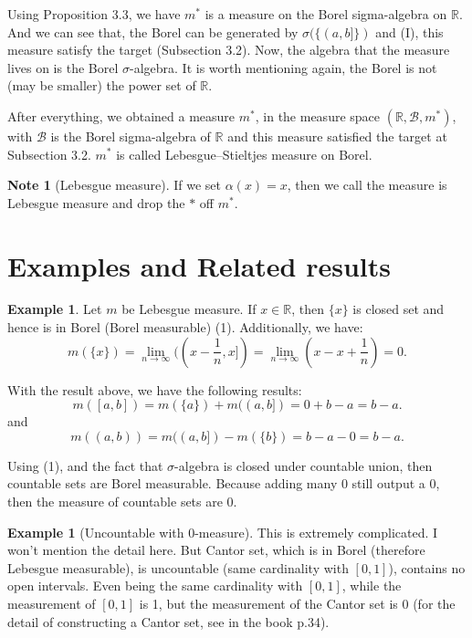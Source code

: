 \documentclass[11pt,a4paper]{article}
\theoremstyle{definition}
\newtheorem{example}[definition]{Example}
\newtheorem{note}[definition]{Note}
\theoremstyle{plain}
\newcommand{\R}{\mathbb{R}}
\begin{document}
Using Proposition 3.3, we have $m^*$ is a measure on the Borel sigma-algebra on $\R$. And we can see that, the Borel can be generated by $\sigma(\{(a,b]\})$ and (I), this measure satisfy the target (Subsection 3.2). Now, the algebra that the measure lives on is the Borel $\sigma$-algebra. It is worth mentioning again, the Borel is not (may be smaller) the power set of $\R$.

After everything, we obtained a measure $m^*$, in the measure space $(\R, \mathcal{B}, m^*)$, with $\mathcal{B}$ is the Borel sigma-algebra of $\R$ and this measure satisfied the target at Subsection 3.2. $m^*$ is called Lebesgue–Stieltjes measure on Borel.

\begin{note}[Lebesgue measure]
If we set $\alpha(x) = x$, then we call the measure is Lebesgue measure and drop the $*$ off $m^*$.
\end{note}

\section{Examples and Related results}

\begin{example}
Let $m$ be Lebesgue measure. If $x \in \R$, then $\{x\}$ is closed set and hence is in Borel (Borel measurable) (1). Additionally, we have:
\[
m(\{x\}) = \lim_{n\rightarrow \infty}((x-\frac{1}{n}, x]) = \lim_{n\rightarrow \infty}(x - x + \frac{1}{n}) = 0.
\]

With the result above, we have the following results:
\[
m([a,b]) = m(\{a\}) + m((a,b]) = 0 + b-a = b-a.
\]
and
\[
m((a,b)) = m((a,b])-m(\{b\}) = b-a-0 =b-a.
\]

Using (1), and the fact that $\sigma$-algebra is closed under countable union, then countable sets are Borel measurable. Because adding many 0 still output a 0, then the measure of countable sets are 0.
\end{example}

\begin{example}[Uncountable with 0-measure]
This is extremely complicated. I won't mention the detail here. But Cantor set, which is in Borel (therefore Lebesgue measurable), is uncountable (same cardinality with $[0,1]$), contains no open intervals. Even being the same cardinality with $[0,1]$, while the measurement of $[0,1]$ is 1, but the measurement of the Cantor set is 0 (for the detail of constructing a Cantor set, see in the book p.34).
\end{example}
\end{document}
